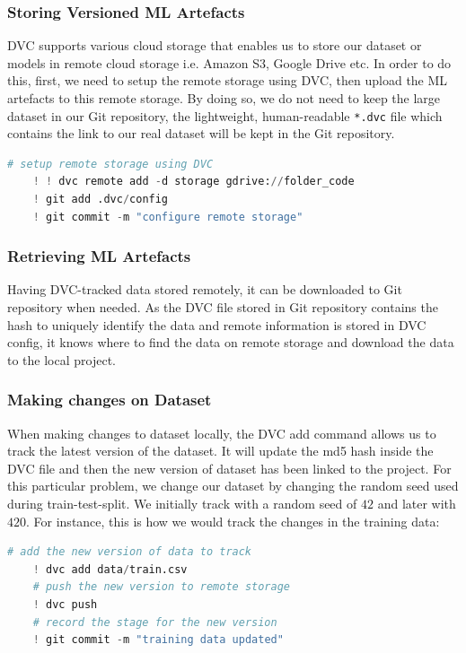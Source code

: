 \documentclass[12pt]{article}
\begin{document}
\subsubsection{Storing Versioned ML Artefacts}

DVC supports various cloud storage that enables us to store our dataset or models in remote cloud storage i.e. Amazon S3, Google Drive etc. In order to do this, first, we need to setup the remote storage using DVC, then upload the ML artefacts to this remote storage. By doing so, we do not need to keep the large dataset in our Git repository, the lightweight, human-readable \verb|*.dvc| file which contains the link to our real dataset will be kept in the Git repository.

\begin{lstlisting}[language=Python]
    # setup remote storage using DVC
    ! ! dvc remote add -d storage gdrive://folder_code
    ! git add .dvc/config
    ! git commit -m "configure remote storage"
\end{lstlisting}

\subsubsection{Retrieving ML Artefacts}

Having DVC-tracked data stored remotely, it can be downloaded to Git repository when needed. As the DVC file stored in Git repository contains the hash to uniquely identify the data and remote information is stored in DVC config, it knows where to find the data on remote storage and download the data to the local project.

\subsubsection{Making changes on Dataset}

When making changes to dataset locally, the DVC add command allows us to track the latest version of the dataset. It will update the md5 hash inside the DVC file and then the new version of dataset has been linked to the project. For this particular problem, we change our dataset by changing the random seed used during train-test-split. We initially track with a random seed of $42$ and later with $420$. For instance, this is how we would track the changes in the training data:
\medskip
\begin{lstlisting}[language=Python]
    # add the new version of data to track
    ! dvc add data/train.csv
    # push the new version to remote storage
    ! dvc push
    # record the stage for the new version
    ! git commit -m "training data updated"
\end{lstlisting}
\end{document}
